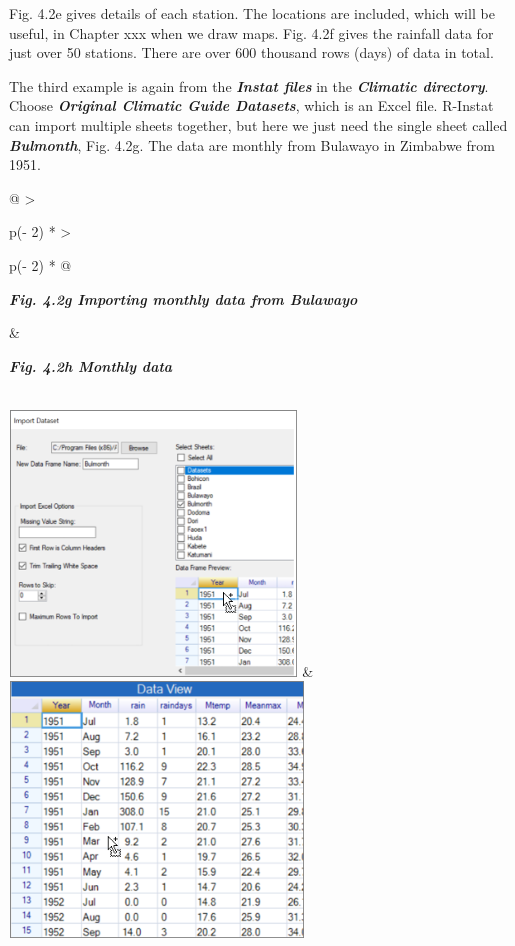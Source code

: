 \documentclass[
  letterpaper,
  DIV=11,
  numbers=noendperiod]{scrreprt}
\begin{document}
Fig. 4.2e gives details of each station. The locations are included,
which will be useful, in Chapter xxx when we draw maps. Fig. 4.2f gives
the rainfall data for just over 50 stations. There are over 600 thousand
rows (days) of data in total.

The third example is again from the \textbf{\emph{Instat files}} in the
\textbf{\emph{Climatic directory}}. Choose \textbf{\emph{Original
Climatic Guide Datasets}}, which is an Excel file. R-Instat can import
multiple sheets together, but here we just need the single sheet called
\textbf{\emph{Bulmonth}}, Fig. 4.2g. The data are monthly from Bulawayo
in Zimbabwe from 1951.

\begin{longtable}[]{@{}
  >{\raggedright\arraybackslash}p{(\columnwidth - 2\tabcolsep) * }
  >{\raggedright\arraybackslash}p{(\columnwidth - 2\tabcolsep) * }@{}}
\toprule\noalign{}
\begin{minipage}[b]{\linewidth}\raggedright
\textbf{\emph{Fig. 4.2g Importing monthly data from Bulawayo}}
\end{minipage} & \begin{minipage}[b]{\linewidth}\raggedright
\textbf{\emph{Fig. 4.2h Monthly data}}
\end{minipage} \\
\midrule\noalign{}
\endhead
\bottomrule\noalign{}
\endlastfoot
\includegraphics[width=3.00521in,height=2.77952in]{figures/Fig4.2g.png}
&
\includegraphics[width=3.07685in,height=2.67713in]{figures/Fig4.2h.png} \\
\end{longtable}
\end{document}
